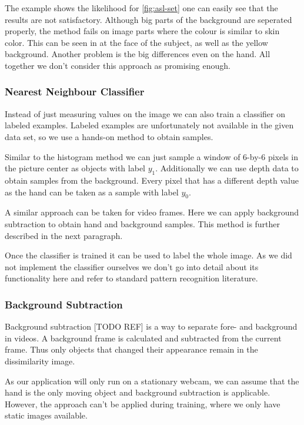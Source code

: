 \documentclass[letterpaper, 10 pt, conference]{ieeeconf}  %
\begin{document}
The example shows the likelihood for \autoref{fig:asl-set} one can easily see that the results are not satisfactory. Although big parts of the background are seperated properly, the method fails on image parts where the colour is similar to skin color. This can be seen in at the face of the subject, as well as the yellow background. Another problem is the big differences even on the hand. All together we don't consider this approach as promising enough.

\subsubsection{Nearest Neighbour Classifier}

Instead of just measuring values on the image we can also train a classifier on labeled examples. Labeled examples are unfortunately not available in the given data set, so we use a hands-on method to obtain samples. 

Similar to the histogram method we can just sample a window of 6-by-6 pixels in the picture center as objects with label $y_1$. Additionally we can use depth data to obtain samples from the background. Every pixel that has a different depth value as the hand can be taken as a sample with label $y_0$.

A similar approach can be taken for video frames. Here we can apply background subtraction to obtain hand and background samples. This method is further described in the next paragraph.

Once the classifier is trained it can be used to label the whole image. As we did not implement the classifier ourselves we don't go into detail about its functionality here and refer to standard pattern recognition literature.

\subsubsection{Background Subtraction}

Background subtraction [TODO REF] is a way to separate fore- and background in videos. A background frame is calculated and subtracted from the current frame. Thus only objects that changed their appearance remain in the dissimilarity image.

As our application will only run on a stationary webcam, we can assume that the hand is the only moving object and background subtraction is applicable. However, the approach can't be applied during training, where we only have static images available.
\end{document}
